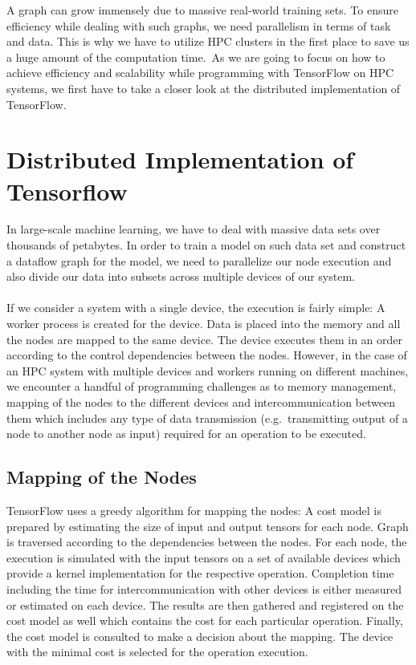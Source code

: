 \documentclass[ieeetran]{article}
\begin{document}
\hspace{-0.51cm}A graph can grow immensely due to massive real-world training sets. To ensure efficiency while dealing with such graphs, we need parallelism in terms of task and data. This is why we have to utilize HPC clusters in the first place to save us a huge amount of the computation time.\ As we are going to focus on how to achieve efficiency and scalability while programming with TensorFlow on HPC systems, we first have to take a closer look at the distributed implementation of TensorFlow.


\section{Distributed Implementation of Tensorflow} %
\label{sec:multiple_device_execution_of_a_graph}
In large-scale machine learning, we have to deal with massive data sets over thousands of petabytes. In order to train a model on such data set and construct a dataflow graph for the model, we need to parallelize our node execution and also divide our data into subsets across multiple devices of our system.
\\ \\If we consider a system with a single device, the execution is fairly simple: A worker process is created for the device. Data is placed into the memory and all the nodes are mapped to the same device. The device executes them in an order according to the control dependencies between the nodes. However, in the case of an HPC system with multiple devices and workers running on different machines, we encounter a handful of programming challenges as to memory management, mapping of the nodes to the different devices and intercommunication between them which includes any type of data transmission (e.g.\ transmitting output of a node to another node as input) required for an operation to be executed.

\subsection{Mapping of the Nodes} %
\label{sub:mapping_of_nodes} 
TensorFlow uses a greedy algorithm for mapping the nodes: A cost model is prepared by estimating the size of input and output tensors for each node. Graph is traversed according to the dependencies between the nodes. For each node, the execution is simulated with the input tensors on a set of available devices which provide a kernel implementation for the respective operation. Completion time including the time for intercommunication with other devices is either measured or estimated on each device. The results are then gathered and registered on the cost model as well which contains the cost for each particular operation. Finally, the cost model is consulted to make a decision about the mapping. The device with the minimal cost is selected for the operation execution.
\end{document}
